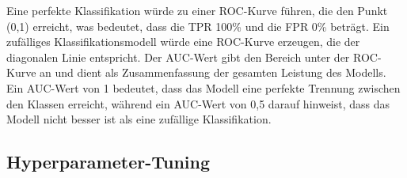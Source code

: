 \documentclass[conference]{IEEEtran}
\begin{document}
\begin{itemize}
          Eine perfekte Klassifikation würde zu einer ROC-Kurve führen, die den Punkt (0,1) erreicht, was bedeutet, dass die TPR 100\% und die FPR 0\% beträgt. Ein zufälliges Klassifikationsmodell würde eine ROC-Kurve erzeugen, die der diagonalen Linie entspricht. Der AUC-Wert gibt den Bereich unter der ROC-Kurve an und dient als Zusammenfassung der gesamten Leistung des Modells. Ein AUC-Wert von 1 bedeutet, dass das Modell eine perfekte Trennung zwischen den Klassen erreicht, während ein AUC-Wert von 0,5 darauf hinweist, dass das Modell nicht besser ist als eine zufällige Klassifikation.
\end{itemize}

\newpage

\subsection{Hyperparameter-Tuning}
\end{document}
